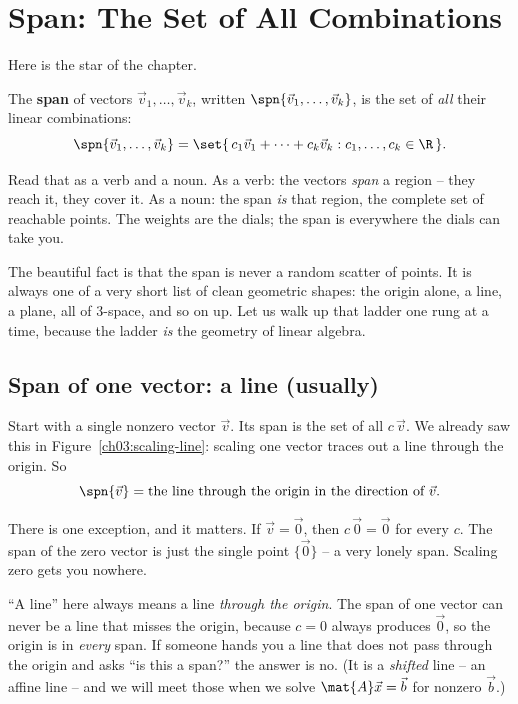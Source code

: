 \section{Span: The Set of All Combinations}

Here is the star of the chapter.

\begin{definition}[Span]\label{ch03:def-span}
The \textbf{span} of vectors $\vec{v}_1,\dots,\vec{v}_k$, written $\spn\{\vec{v}_1,\dots,\vec{v}_k\}$, is the set of \emph{all} their linear combinations:
\[
  \spn\{\vec{v}_1,\dots,\vec{v}_k\}
  = \set{\, c_1\vec{v}_1 + \cdots + c_k\vec{v}_k : c_1,\dots,c_k \in \R \,}.
\]
\end{definition}

Read that as a verb and a noun. As a verb: the vectors \emph{span} a region -- they reach it, they cover it. As a noun: the span \emph{is} that region, the complete set of reachable points. The weights are the dials; the span is everywhere the dials can take you.

The beautiful fact is that the span is never a random scatter of points. It is always one of a very short list of clean geometric shapes: the origin alone, a line, a plane, all of $3$-space, and so on up. Let us walk up that ladder one rung at a time, because the ladder \emph{is} the geometry of linear algebra.

\subsection{Span of one vector: a line (usually)}

Start with a single nonzero vector $\vec{v}$. Its span is the set of all $c\,\vec{v}$. We already saw this in Figure~\ref{ch03:scaling-line}: scaling one vector traces out a line through the origin. So
\[
  \spn\{\vec{v}\} = \text{the line through the origin in the direction of } \vec{v}.
\]

There is one exception, and it matters. If $\vec{v} = \vec{0}$, then $c\,\vec{0} = \vec{0}$ for every $c$. The span of the zero vector is just the single point $\{\vec{0}\}$ -- a very lonely span. Scaling zero gets you nowhere.

\begin{trapbox}
``A line'' here always means a line \emph{through the origin}. The span of one vector can never be a line that misses the origin, because $c=0$ always produces $\vec{0}$, so the origin is in \emph{every} span. If someone hands you a line that does not pass through the origin and asks ``is this a span?'' the answer is no. (It is a \emph{shifted} line -- an affine line -- and we will meet those when we solve $\mat{A}\vec{x}=\vec{b}$ for nonzero $\vec{b}$.)
\end{trapbox}

